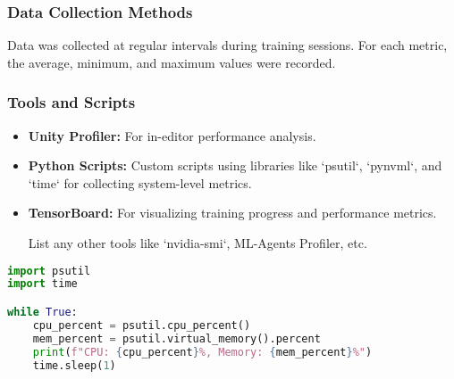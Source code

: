 \subsubsection{Data Collection Methods}
Data was collected at regular intervals during training sessions. For each metric, the average, minimum, and maximum values were recorded.

\subsubsection{Tools and Scripts}
\begin{itemize}
    \item \textbf{Unity Profiler:} For in-editor performance analysis.
    \item \textbf{Python Scripts:} Custom scripts using libraries like `psutil`, `pynvml`, and `time` for collecting system-level metrics.
    \item \textbf{TensorBoard:} For visualizing training progress and performance metrics.
    \item [List any other tools like `nvidia-smi`, ML-Agents Profiler, etc.]
\end{itemize}

\begin{lstlisting}[language=Python, caption=Example Python Script for Monitoring]
import psutil
import time

while True:
    cpu_percent = psutil.cpu_percent()
    mem_percent = psutil.virtual_memory().percent
    print(f"CPU: {cpu_percent}%, Memory: {mem_percent}%")
    time.sleep(1)
\end{lstlisting}